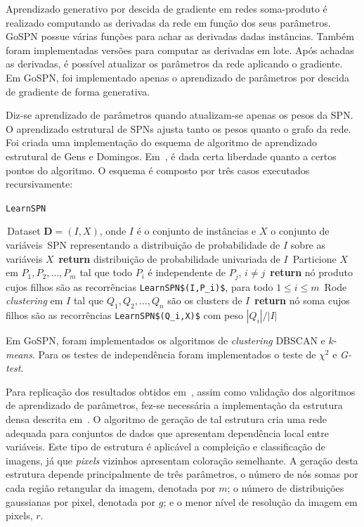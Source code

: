 \documentclass[12pt]{article}
\theoremstyle{plain}
\numberwithin{equation}{section}
\newcommand{\code}[1]{\lstinline[mathescape=true]{#1}}
\newcommand{\mcode}[1]{\lstinline[mathescape]!#1!}
\begin{document}
Aprendizado generativo por descida de gradiente em redes soma-produto é realizado computando as
derivadas da rede em função dos seus parâmetros. GoSPN possue várias funções para achar as
derivadas dadas instâncias. Também foram implementadas versões para computar as derivadas em lote.
Após achadas as derivadas, é possível atualizar os parâmetros da rede aplicando o gradiente. Em
GoSPN, foi implementado apenas o aprendizado de parâmetros por descida de gradiente de forma
generativa.

Diz-se aprendizado de parâmetros quando atualizam-se apenas os pesos da SPN\@. O aprendizado
estrutural de SPNs ajusta tanto os pesos quanto o grafo da rede. Foi criada uma implementação do
esquema de algoritmo de aprendizado estrutural de Gens e Domingos. Em~\cite{gens-domingos}, é dada
certa liberdade quanto a certos pontos do algoritmo. O esquema é composto por três casos executados
recursivamente:

\begin{algorithm}[H]
  \caption*{\code{LearnSPN}~\cite{gens-domingos}}
  \begin{algorithmic}[1]
    \Require\,Dataset $\mathbf{D}=(I,X)$, onde $I$ é o conjunto de instâncias e $X$ o conjunto de
    variáveis
    \Ensure\,SPN representando a distribuição de probabilidade de $I$ sobre as variáveis $X$
      \State\,\textbf{return} distribuição de probabilidade univariada de $I$
    \Else%
      \State\,Particione $X$ em $P_1,P_2,\ldots,P_m$ tal que todo $P_i$ é independente de $P_j$,
      $i\neq j$
        \State\,\textbf{return} nó produto cujos filhos são as recorrências
        \mcode{LearnSPN$(I,P_i)$}, para todo $1\leq i\leq m$
      \Else%
        \State\,Rode \textit{clustering} em $I$ tal que $Q_1,Q_2,\ldots,Q_n$ são os clusters de $I$
        \State\,\textbf{return} nó soma cujos filhos são as recorrências \mcode{LearnSPN$(Q_i,X)$}
        com peso $|Q_i|/|I|$
      \EndIf%
    \EndIf%
  \end{algorithmic}
\end{algorithm}

Em GoSPN, foram implementados os algoritmos de \textit{clustering} DBSCAN e $k$-\textit{means}.
Para os testes de independência foram implementados o teste de $\chi^2$ e \textit{G-test}.

Para replicação dos resultados obtidos em~\cite{poon-domingos}, assim como validação dos algoritmos
de aprendizado de parâmetros, fez-se necessária a implementação da estrutura densa descrita
em~\cite{poon-domingos}. O algoritmo de geração de tal estrutura cria uma rede adequada para
conjuntos de dados que apresentam dependência local entre variáveis. Este tipo de estrutura é
aplicável a compleição e classificação de imagens, já que \textit{pixels} vizinhos apresentam
coloração semelhante. A geração desta estrutura depende principalmente de três parâmetros, o número
de nós somas por cada região retangular da imagem, denotada por $m$; o número de distribuições
gaussianas por pixel, denotada por $g$; e o menor nível de resolução da imagem em pixels, $r$.
\end{document}
